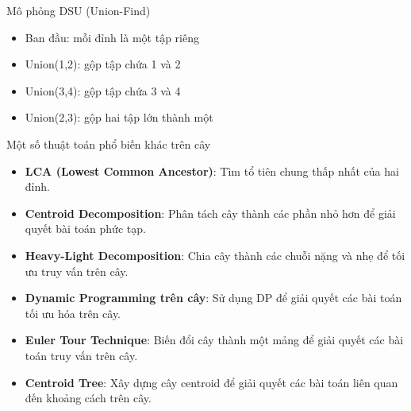 \documentclass[aspectratio=169]{beamer}
\begin{document}
\begin{frame}{Mô phỏng DSU (Union-Find)}

\begin{center}
\end{center}

\begin{itemize}
\item<1-> Ban đầu: mỗi đỉnh là một tập riêng
\item<2-> Union(1,2): gộp tập chứa 1 và 2
\item<3-> Union(3,4): gộp tập chứa 3 và 4
\item<4-> Union(2,3): gộp hai tập lớn thành một
\end{itemize}

\end{frame}

\begin{frame}{Một số thuật toán phổ biến khác trên cây}
\begin{itemize}
    \item \textbf{LCA (Lowest Common Ancestor)}: Tìm tổ tiên chung thấp nhất của hai đỉnh.
    \item \textbf{Centroid Decomposition}: Phân tách cây thành các phần nhỏ hơn để giải quyết bài toán phức tạp.
    \item \textbf{Heavy-Light Decomposition}: Chia cây thành các chuỗi nặng và nhẹ để tối ưu truy vấn trên cây.
    \item \textbf{Dynamic Programming trên cây}: Sử dụng DP để giải quyết các bài toán tối ưu hóa trên cây.
    \item \textbf{Euler Tour Technique}: Biến đổi cây thành một mảng để giải quyết các bài toán truy vấn trên cây.
    \item \textbf{Centroid Tree}: Xây dựng cây centroid để giải quyết các bài toán liên quan đến khoảng cách trên cây.
\end{itemize}
\end{frame}
\end{document}
